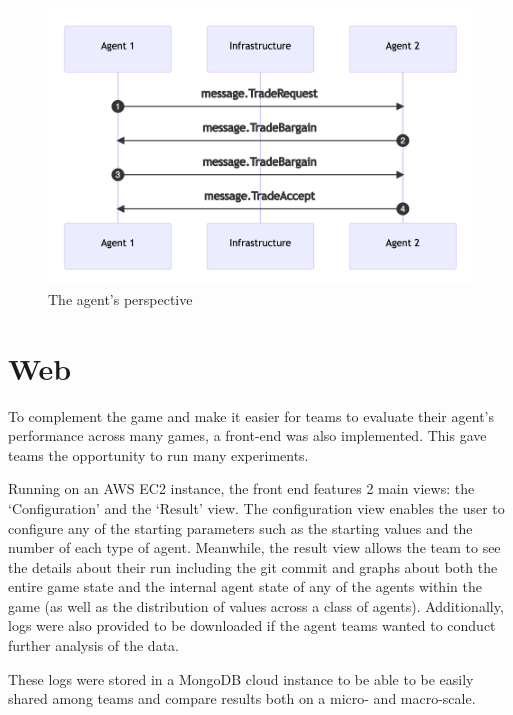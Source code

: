 \begin{figure}[htb]
    \centering
    \includegraphics{003_infrastructure/images/trade2.png}
    \caption{The agent's perspective}
    \label{fig:trade_agent}
\end{figure}

\section{Web}
To complement the game and make it easier for teams to evaluate their agent’s performance across many games, a front-end was also implemented. This gave teams the opportunity to run many experiments.

Running on an AWS EC2 instance, the front end features 2 main views: the ‘Configuration’ and the ‘Result’ view. The configuration view enables the user to configure any of the starting parameters such as the starting values and the number of each type of agent. Meanwhile, the result view allows the team to see the details about their run including the git commit and graphs about both the entire game state and the internal agent state of any of the agents within the game (as well as the distribution of values across a class of agents). Additionally, logs were also provided to be downloaded if the agent teams wanted to conduct further analysis of the data.

These logs were stored in a MongoDB cloud instance to be able to be easily shared among teams and compare results both on a micro- and macro-scale.
